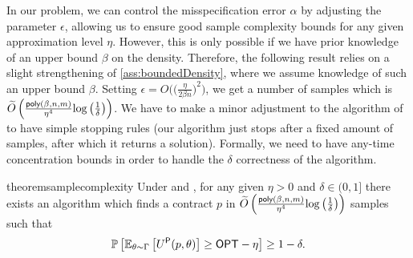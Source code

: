 

In our problem, we can control the misspecification error $\alpha$ by adjusting the parameter $\epsilon$, allowing us to ensure good sample complexity bounds for any given approximation level $\eta$. However, this is only possible if we have prior knowledge of an upper bound $\beta$ on the density. Therefore, the following result relies on a slight strengthening of \cref{ass:boundedDensity}, where we assume knowledge of such an upper bound $\beta$.
%
Setting $\epsilon=O\Big(\big(\frac{\eta}{2\beta n}\big)^2\Big)$, we get a number of samples which is $\widetilde O\left(\frac{\textsf{poly}(\beta, n, m)}{\eta^4}{\log\left(\frac{1}\delta\right)}\right)$.
%
We have to make a minor adjustment to the algorithm of \citet{lattimore2020learning} to have simple stopping rules (our algorithm just stops after a fixed amount of samples, after which it returns a solution). Formally, we need to have any-time concentration bounds in order to handle the $\delta$ correctness of the algorithm.

\begin{restatable}{theorem}{samplecomplexity}\label{thm:sample}
    Under  and , for any given $\eta>0$ and $\delta\in(0,1]$ there exists an algorithm which finds a contract $p$ in $\widetilde O\left(\frac{\textsf{poly}(\beta, n, m)}{\eta^4}{\log\left(\frac{1}\delta\right)}\right)$ samples such that
    \[
    \mathbb{P}\left[\mathbb{E}_{\theta\sim \Gamma}\left[U^\textsf{P}(p,\theta)\right]\ge \textsf{OPT}-\eta\right]\ge 1-\delta.
    \]
\end{restatable}







 




